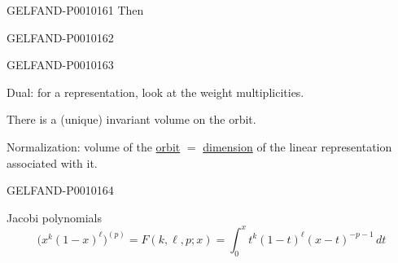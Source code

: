 \begin{GelfandAdjacentEvidence}{GELFAND-P001016}{1}
Then
\end{GelfandAdjacentEvidence}
\begin{GelfandAdjacentEvidence}{GELFAND-P001016}{2}


\end{GelfandAdjacentEvidence}
\begin{GelfandAdjacentEvidence}{GELFAND-P001016}{3}


Dual: for a representation, look at the weight multiplicities.

There is a (unique) invariant volume on the orbit.

Normalization: volume of the \underline{orbit} $=$ \underline{dimension} of the linear representation associated with it.
\end{GelfandAdjacentEvidence}
\begin{GelfandAdjacentEvidence}{GELFAND-P001016}{4}


Jacobi polynomials
\[
\bigl(x^k(1-x)^\ell\bigr)^{(p)}=F(k,\ell,p;x)
=\int_0^x t^k(1-t)^\ell(x-t)^{-p-1}\,dt
\]
\end{GelfandAdjacentEvidence}
